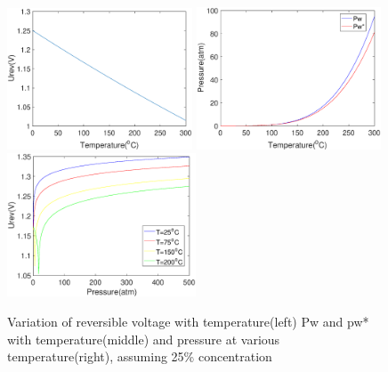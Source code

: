 \begin{figure} [h] 

\includegraphics[width=5.5cm]{temperature.eps} 
\includegraphics[width=5.5cm]{pw.eps} 
\includegraphics[width=5.6cm] {pressure.eps} 

\caption{Variation of reversible voltage with temperature(left) Pw and pw* with temperature(middle) and pressure at various temperature(right), assuming 25\% concentration} 
\label{fig:Urev}

\end{figure} 



